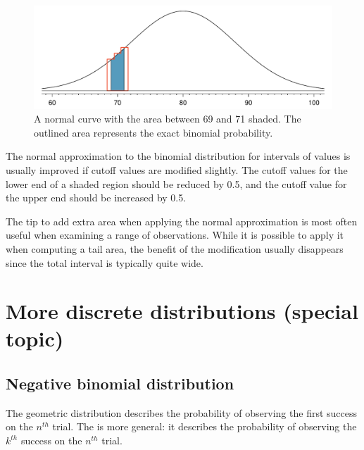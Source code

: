 \begin{figure}[h]
\centering
\includegraphics[width=\textwidth]{ch_distributions/figures/normApproxToBinomFail/normApproxToBinomFail}
\caption{A normal curve with the area between 69 and 71 shaded. The outlined area represents the exact binomial probability.}
\label{normApproxToBinomFail}
\end{figure}

\begin{tipBox}{
The normal approximation to the binomial distribution for intervals of values is usually improved if cutoff values are modified slightly. The cutoff values for the lower end of a shaded region should be reduced by 0.5, and the cutoff value for the upper end should be increased by 0.5.}
\end{tipBox}

The tip to add extra area when applying the normal approximation is most often useful when examining a range of observations. While it is possible to apply it when computing a tail area, the benefit of the modification usually disappears since the total interval is typically quite wide.




\section{More discrete distributions (special topic)}
\label{discreteModels}

\subsection{Negative binomial distribution}
\label{negativeBinomial}


The geometric distribution describes the probability of observing the first success on the $n^{th}$ trial. The  is more general: it describes the probability of observing the $k^{th}$ success on the $n^{th}$ trial.

